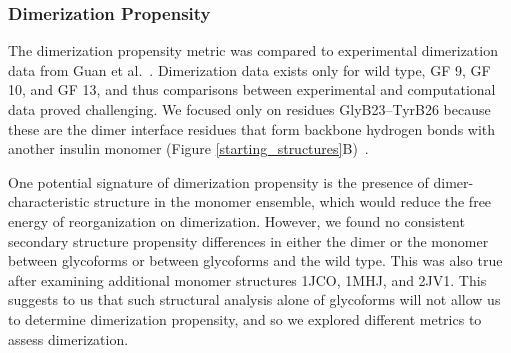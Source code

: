 \documentclass[9pt]{elife}
\begin{document}

\subsubsection{Dimerization Propensity}
The dimerization propensity metric was compared to experimental dimerization data from Guan et al.~\cite{guan2018chemically}. Dimerization data exists only for wild type, GF 9, GF 10, and GF 13, and thus comparisons between experimental and computational data proved challenging. We focused only on residues GlyB23--TyrB26 because these are the dimer interface residues that form backbone hydrogen bonds with another insulin monomer (Figure \ref{starting_structures}B)~\cite{timofeev2010x, harding1966crystal, antolikova2011dimerinterface}. 

One potential signature of dimerization propensity is the presence of dimer-characteristic structure in the monomer ensemble, which would reduce the free energy of reorganization on dimerization. However, we found no consistent secondary structure propensity differences in either the dimer or the monomer between glycoforms or between glycoforms and the wild type. This was also true after examining additional monomer structures 1JCO, 1MHJ, and 2JV1. This suggests to us that such structural analysis alone of glycoforms will not allow us to determine dimerization propensity, and so we explored different metrics to assess dimerization.
\end{document}
